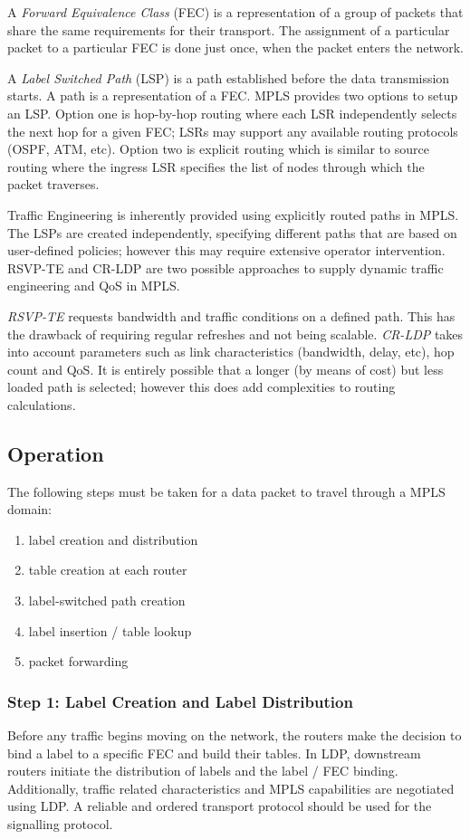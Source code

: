 A \textit{Forward Equivalence Class} (FEC) is a representation of a group of packets that share the same requirements for their transport. The assignment of a particular packet to a particular FEC is done just once, when the packet enters the network. 

A \textit{Label Switched Path} (LSP) is a path established before the data transmission starts. A path is a representation of a FEC. MPLS provides two options to setup an LSP. Option one is hop-by-hop routing where each LSR independently selects the next hop for a given FEC; LSRs may support any available routing protocols (OSPF, ATM, etc). Option two is explicit routing which is similar to source routing where the ingress LSR specifies the list of nodes through which the packet traverses.

Traffic Engineering is inherently provided using explicitly routed paths in MPLS. The LSPs are created independently, specifying different paths that are based on user-defined policies; however this may require extensive operator intervention. RSVP-TE and CR-LDP are two possible approaches to supply dynamic traffic engineering and QoS in MPLS. 

\textit{RSVP-TE} requests bandwidth and traffic conditions on a defined path. This has the drawback of requiring regular refreshes and not being scalable. \textit{CR-LDP} takes into account parameters such as link characteristics (bandwidth, delay, etc), hop count and QoS. It is entirely possible that a longer (by means of cost) but less loaded path is selected; however this does add complexities to routing calculations.

\subsection{Operation}
The following steps must be taken for a data packet to travel through a MPLS domain:
\begin{enumerate}
    \item label creation and distribution
    \item table creation at each router
    \item label-switched path creation
    \item label insertion / table lookup
    \item packet forwarding
\end{enumerate}

\subsubsection{Step 1: Label Creation and Label Distribution}
Before any traffic begins moving on the network, the routers make the decision to bind a label to a specific FEC and build their tables. In LDP, downstream routers initiate the distribution of labels and the label / FEC binding. Additionally, traffic related characteristics and MPLS capabilities are negotiated using LDP. A reliable and ordered transport protocol should be used for the signalling protocol.


